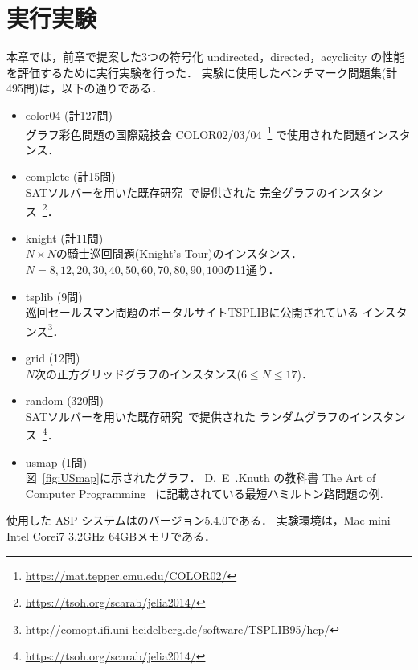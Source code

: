 \chapter{実行実験}\label{chap:experiment}

本章では，前章で提案した3つの符号化
\textsf{undirected}，\textsf{directed}，\textsf{acyclicity}
の性能を評価するために実行実験を行った．
%
実験に使用したベンチマーク問題集(計495問)は，以下の通りである．
\begin{itemize}
\item \textsf{color04} (計127問)\\
  グラフ彩色問題の国際競技会
  COLOR02/03/04~\footnote{\url{https://mat.tepper.cmu.edu/COLOR02/}}
  で使用された問題インスタンス．
\item \textsf{complete} (計15問)\\
  SATソルバーを用いた既存研究~\cite{soh14:jelia2014}で提供された
  完全グラフのインスタンス~\footnote{\url{https://tsoh.org/scarab/jelia2014/}}．
\item \textsf{knight} (計11問)\\
  $N\times N$の騎士巡回問題(Knight's Tour)のインスタンス．\\
  $N=8,12,20,30,40,50,60,70,80,90,100$の11通り．
\item \textsf{tsplib} (9問)\\
  巡回セールスマン問題のポータルサイトTSPLIBに公開されている
  インスタンス\footnote{\url{http://comopt.ifi.uni-heidelberg.de/software/TSPLIB95/hcp/}}．
\item \textsf{grid} (12問)\\
  $N$次の正方グリッドグラフのインスタンス($6\leq N\leq 17$)．
\item \textsf{random} (320問)\\
  SATソルバーを用いた既存研究~\cite{soh14:jelia2014}で提供された
  ランダムグラフのインスタンス~\footnote{\url{https://tsoh.org/scarab/jelia2014/}}．
\item \textsf{usmap} (1問)\\
  図~\ref{fig:USmap}に示されたグラフ．
  D.~E~.Knuth の教科書
  The Art of Computer Programming~\cite{Knuth:TAOCP:SAT}
  に記載されている最短ハミルトン路問題の例.
\end{itemize}

使用した ASP システムは{\clingo}のバージョン5.4.0である．
実験環境は，Mac mini Intel Corei7 3.2GHz 64GBメモリである．

